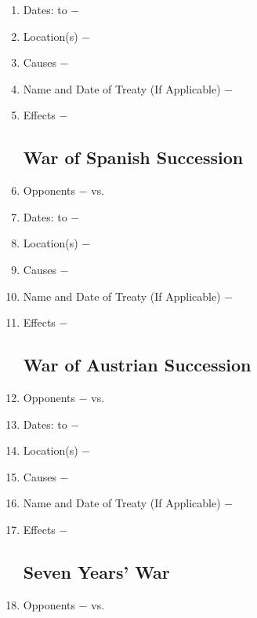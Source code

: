 \documentclass[12pt]{article}
\begin{document}
\begin{enumerate}
\item Dates: to $-$

\item Location(s) $-$ 

\item Causes $-$

\item Name and Date of Treaty (If Applicable) $-$ 

\item Effects $-$ 

\subsection{War of Spanish Succession}
 
\item Opponents $-$ vs.

\item Dates: to $-$

\item Location(s) $-$ 

\item Causes $-$

\item Name and Date of Treaty (If Applicable) $-$ 

\item Effects $-$ 

\subsection{War of Austrian Succession}

\item Opponents $-$ vs.

\item Dates: to $-$

\item Location(s) $-$ 

\item Causes $-$

\item Name and Date of Treaty (If Applicable) $-$ 

\item Effects $-$ 

\subsection{Seven Years' War}

\item Opponents $-$ vs.


\end{enumerate}
\end{document}
